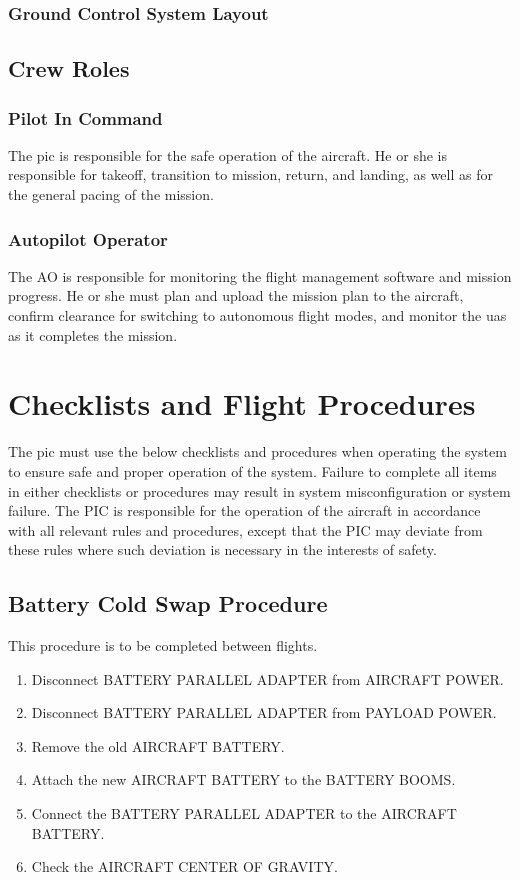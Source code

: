 \documentclass{report}
\begin{document}
		\subsection{Ground Control System Layout}
	\section{Crew Roles}
		\subsection{Pilot In Command}
			The \gls{pic} is responsible for the safe operation of the aircraft.  He or she is responsible for takeoff, transition to mission, return, and landing, as well as for the general pacing of the mission.
		\subsection{Autopilot Operator}
			The \gls{AO} is responsible for monitoring the flight management software and mission progress.  He or she must plan and upload the mission plan to the aircraft, confirm clearance for switching to autonomous flight modes, and monitor the \gls{uas} as it completes the mission.
\chapter{Checklists and Flight Procedures}
	The \gls{pic} must use the below checklists and procedures when operating the system to ensure safe and proper operation of the system.  Failure to complete all items in either checklists or procedures may result in system misconfiguration or system failure.  The PIC is responsible for the operation of the aircraft in accordance with all relevant rules and procedures, except that the PIC may deviate from these rules where such deviation is necessary in the interests of safety.
	\section{Battery Cold Swap Procedure}
		This procedure is to be completed between flights.
		\begin{enumerate}
			\item Disconnect BATTERY PARALLEL ADAPTER from AIRCRAFT POWER.
			\item Disconnect BATTERY PARALLEL ADAPTER from PAYLOAD POWER.
			\item Remove the old AIRCRAFT BATTERY.
			\item Attach the new AIRCRAFT BATTERY to the BATTERY BOOMS.
			\item Connect the BATTERY PARALLEL ADAPTER to the AIRCRAFT BATTERY.
			\item Check the AIRCRAFT CENTER OF GRAVITY.
		\end{enumerate}
\end{document}
